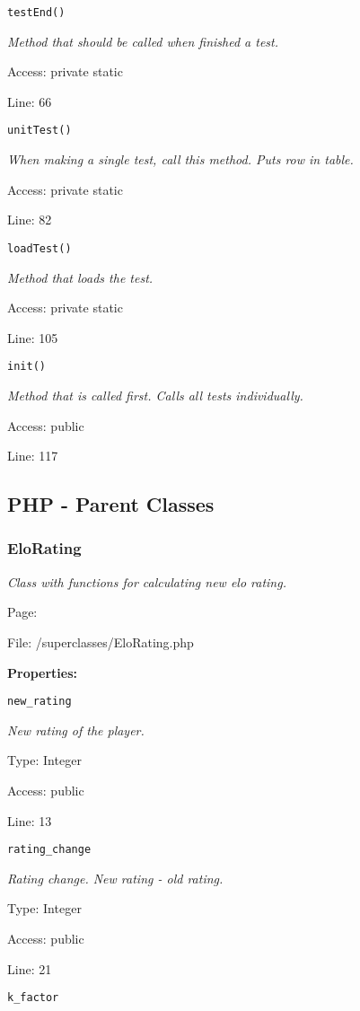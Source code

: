 \texttt{testEnd()}

{\scriptsize
\textit{Method that should be called when finished a test.}

Access: private static

Line: 66

}

\texttt{unitTest()}

{\scriptsize
\textit{When making a single test, call this method.
Puts row in table.}

Access: private static

Line: 82

}

\texttt{loadTest()}

{\scriptsize
\textit{Method that loads the test.}

Access: private static

Line: 105

}

\texttt{init()}

{\scriptsize
\textit{Method that is called first.
Calls all tests individually.}

Access: public

Line: 117

}

\subsection{PHP - Parent Classes}
\subsubsection{EloRating}\label{EloRating.php.doc}
\textit{Class with functions for calculating new elo rating.}

Page: \pageref{EloRating.php}

File: /superclasses/EloRating.php

\textbf{Properties:}

\texttt{new\_rating}

{\scriptsize
\textit{New rating of the player.}

Type: Integer

Access: public

Line: 13

}
\texttt{rating\_change}

{\scriptsize
\textit{Rating change.
New rating - old rating.}

Type: Integer

Access: public

Line: 21

}
\texttt{k\_factor}

